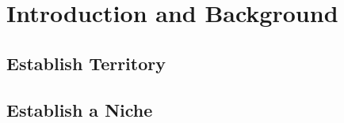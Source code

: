 
\cleardoublepage


\chapter{Introduction and Background}



\section{Establish Territory}





\section{Establish a Niche}

